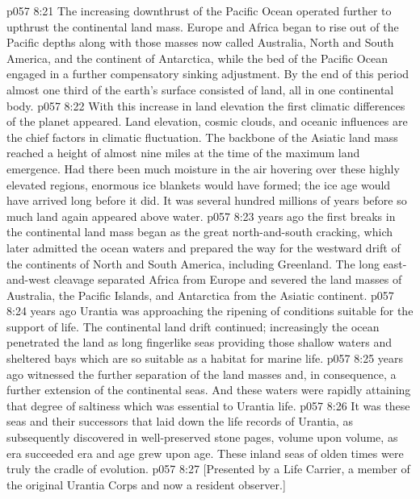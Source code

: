 \vs p057 8:21 The increasing downthrust of the Pacific Ocean operated further to upthrust the continental land mass. Europe and Africa began to rise out of the Pacific depths along with those masses now called Australia, North and South America, and the continent of Antarctica, while the bed of the Pacific Ocean engaged in a further compensatory sinking adjustment. By the end of this period almost one third of the earth’s surface consisted of land, all in one continental body.
\vs p057 8:22 With this increase in land elevation the first climatic differences of the planet appeared. Land elevation, cosmic clouds, and oceanic influences are the chief factors in climatic fluctuation. The backbone of the Asiatic land mass reached a height of almost nine miles at the time of the maximum land emergence. Had there been much moisture in the air hovering over these highly elevated regions, enormous ice blankets would have formed; the ice age would have arrived long before it did. It was several hundred millions of years before so much land again appeared above water.
\pc \vs p057 8:23  years ago the first breaks in the continental land mass began as the great north\hyp{}and\hyp{}south cracking, which later admitted the ocean waters and prepared the way for the westward drift of the continents of North and South America, including Greenland. The long east\hyp{}and\hyp{}west cleavage separated Africa from Europe and severed the land masses of Australia, the Pacific Islands, and Antarctica from the Asiatic continent.
\pc \vs p057 8:24  years ago Urantia was approaching the ripening of conditions suitable for the support of life. The continental land drift continued; increasingly the ocean penetrated the land as long fingerlike seas providing those shallow waters and sheltered bays which are so suitable as a habitat for marine life.
\pc \vs p057 8:25  years ago witnessed the further separation of the land masses and, in consequence, a further extension of the continental seas. And these waters were rapidly attaining that degree of saltiness which was essential to Urantia life.
\vs p057 8:26 It was these seas and their successors that laid down the life records of Urantia, as subsequently discovered in well\hyp{}preserved stone pages, volume upon volume, as era succeeded era and age grew upon age. These inland seas of olden times were truly the cradle of evolution.
\vsetoff
\vs p057 8:27 [Presented by a Life Carrier, a member of the original Urantia Corps and now a resident observer.]
